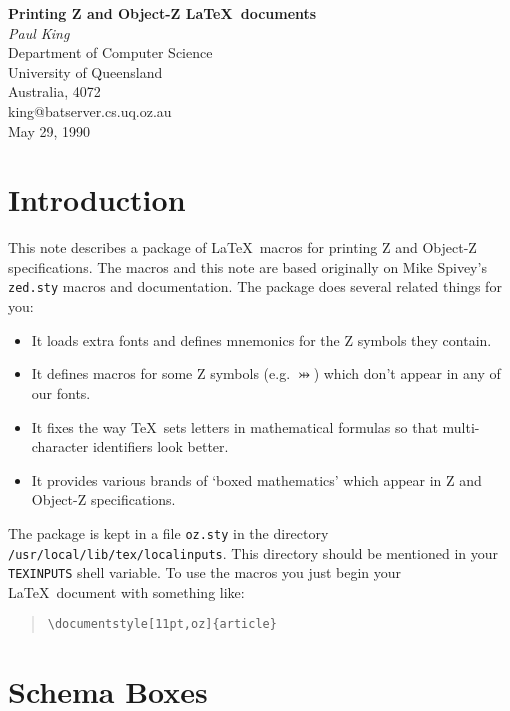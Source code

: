 \documentclass[a4paper]{article}
\begin{document}
\begin{center}
{\Large\bf Printing Z and Object-Z \LaTeX\ documents}\\[2.5ex]
{\em Paul King}\\[1ex]
Department of Computer Science\\
University of Queensland\\
Australia, 4072\\
king@batserver.cs.uq.oz.au\\[1ex]
May 29, 1990
\end{center}

\section{Introduction}
This note describes a package of \LaTeX\ macros for printing
Z and Object-Z specifications.  The macros and this note are
based originally on Mike Spivey's \verb'zed.sty' macros and documentation.
The package does several related things for you:
\begin{itemize}
\item   It loads extra fonts and defines mnemonics
        for the Z symbols they contain.
\item   It defines macros for some Z symbols (e.g. $\pinj$) which
        don't appear in any of our fonts.
\item   It fixes the way \TeX\ sets letters in mathematical formulas so
        that multi-character identifiers look better.
\item   It provides various brands of `boxed mathematics'
        which appear in Z and Object-Z specifications.
\end{itemize}

The package is kept in a file {\tt oz.sty}
in the directory \verb|/usr/local/lib/tex/localinputs|.
This directory should be mentioned in your \verb|TEXINPUTS| shell variable.
To use the macros you just begin your \LaTeX\ document with something like:
\begin{quote}
\begin{verbatim}
\documentstyle[11pt,oz]{article}
\end{verbatim}
\end{quote}
\vspace*{-1.5ex}

\section{Schema Boxes}
\end{document}

